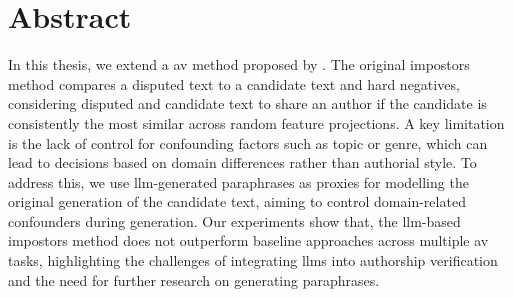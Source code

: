 \chapter*{Abstract}

In this thesis, we extend a \acl{av} method proposed by \citet{koppel_determining_2014}. 
The original impostors method compares a disputed text to a candidate text and hard negatives, considering disputed and candidate text to share an author if the candidate is consistently the most similar across random feature projections. 
A key limitation is the lack of control for confounding factors such as topic or genre, which can lead to decisions based on domain differences rather than authorial style. 
To address this, we use \acs{llm}-generated paraphrases as proxies for modelling the original generation of the candidate text, aiming to control domain-related confounders during \imp{} generation. 
Our experiments show that, the \acs{llm}-based impostors method does not outperform baseline approaches across multiple \acl{av} tasks, highlighting the challenges of integrating \acsp{llm} into authorship verification and the need for further research on generating paraphrases.
